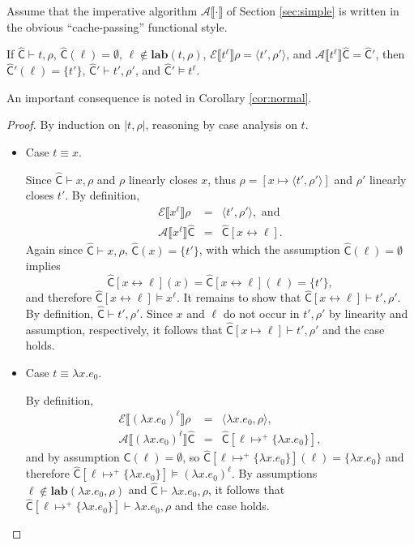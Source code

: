 \documentclass{llncs}
\newcommand{\loves}{\ensuremath{\vdash}}
\newcommand\lab[1]{\ensuremath{\mathbf{lab}(#1)}}
\newcommand\ev[1]{\ensuremath{\mathcal{E}\sem{#1}}}
\newcommand\av[1]{\ensuremath{\mathcal{A}\sem{#1}}}
\newcommand\sem[1]{\ensuremath{\llbracket #1 \rrbracket}}
\newcommand\cache{\widehat{\mathsf{C}}}
\begin{document}
Assume that the imperative algorithm $\av{\cdot}$ of Section
\ref{sec:simple} is written in the obvious ``cache-passing''
functional style.  

\begin{theorem}\label{thm:main}
If $\cache\loves t,\rho$, $\cache(\ell)=\emptyset$,
$\ell\notin\lab{t,\rho}$, $\ev{t^\ell}{\rho} = \langle
t',\rho'\rangle$, and $\av{t^\ell}{\cache} = \cache'$, then
$\cache'(\ell) = \{ t' \}$, $\cache'\loves t',\rho'$, and
$\cache'\models t^\ell$.
\end{theorem}
An important consequence is noted in Corollary \ref{cor:normal}.

\begin{proof} By induction on $|t,\rho|$, reasoning by case analysis on $t$.
\begin{itemize}
\item Case $t\equiv x$.

Since $\cache\loves x,\rho$ and $\rho$ linearly closes $x$, thus $\rho
= [x\mapsto \langle t',\rho'\rangle]$ and $\rho'$ linearly closes
$t'$.  By definition,
\begin{eqnarray*}
\ev{x^\ell}\rho &=& \langle t',\rho'\rangle, \mbox{ and}\\
\av{x^\ell}\cache &=& \cache[x\leftrightarrow \ell].
\end{eqnarray*}
Again since $\cache\loves x,\rho$, $\cache(x) = \{t'\}$, with which the
assumption $\cache(\ell)=\emptyset$ implies
\begin{displaymath}
\cache[x\leftrightarrow\ell](x) =
\cache[x\leftrightarrow\ell](\ell) = 
\{t'\},
\end{displaymath}
and therefore $\cache[x\leftrightarrow\ell]\models x^\ell$.  It
remains to show that $\cache[x\leftrightarrow\ell]\loves t',\rho'$.
By definition, $\cache\loves t',\rho'$.  Since $x$ and $\ell$ do not
occur in $t',\rho'$ by linearity and assumption, respectively, it
follows that $\cache[x\mapsto\ell]\loves t',\rho'$ and the case
holds.

\item Case $t\equiv \lambda x.e_0$.

By definition,
\begin{eqnarray*}
\ev{(\lambda x.e_0)^\ell}\rho & = & \langle\lambda x.e_0,\rho\rangle,\\
\av{(\lambda x.e_0)^\ell}\cache & = & \cache[\ell\mapsto^+ \{\lambda x.e_0\}],
\end{eqnarray*}
and by assumption $\cache(\ell) = \emptyset$, so $\cache[\ell\mapsto^+
\{\lambda x.e_0\}](\ell) = \{\lambda x.e_0\}$ and therefore
$\cache[\ell\mapsto^+ \{\lambda x.e_0\}]\models (\lambda x.e_0)^\ell$.
By assumptions $\ell\notin\lab{\lambda x.e_0,\rho}$ and
$\cache\loves\lambda x.e_0,\rho$, it follows that
$\cache[\ell\mapsto^+ \{\lambda x.e_0\}]\loves\lambda x.e_0,\rho$ and
the case holds.


\end{itemize}
\end{proof}
\end{document}
